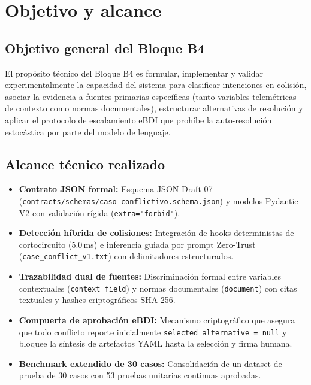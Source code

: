 \documentclass[11pt,a4paper]{article}
\begin{document}
\section{Objetivo y alcance}

\subsection{Objetivo general del Bloque B4}
El propósito técnico del Bloque B4 es formular, implementar y validar experimentalmente la capacidad del sistema para clasificar intenciones en colisión, asociar la evidencia a fuentes primarias específicas (tanto variables telemétricas de contexto como normas documentales), estructurar alternativas de resolución y aplicar el protocolo de escalamiento eBDI que prohíbe la auto-resolución estocástica por parte del modelo de lenguaje.

\subsection{Alcance técnico realizado}
\begin{itemize}[leftmargin=*]
    \item \textbf{Contrato JSON formal:} Esquema JSON Draft-07 (\texttt{contracts/schemas/caso-conflictivo.schema.json}) y modelos Pydantic V2 con validación rígida (\texttt{extra="forbid"}).
    \item \textbf{Detección híbrida de colisiones:} Integración de hooks deterministas de cortocircuito (5.0\,ms) e inferencia guiada por prompt Zero-Trust (\texttt{case\_conflict\_v1.txt}) con delimitadores estructurados.
    \item \textbf{Trazabilidad dual de fuentes:} Discriminación formal entre variables contextuales (\texttt{context\_field}) y normas documentales (\texttt{document}) con citas textuales y hashes criptográficos SHA-256.
    \item \textbf{Compuerta de aprobación eBDI:} Mecanismo criptográfico que asegura que todo conflicto reporte inicialmente \texttt{selected\_alternative = null} y bloquee la síntesis de artefactos YAML hasta la selección y firma humana.
    \item \textbf{Benchmark extendido de 30 casos:} Consolidación de un dataset de prueba de 30 casos con 53 pruebas unitarias continuas aprobadas.
\end{itemize}
\end{document}
